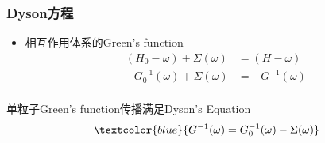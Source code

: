 \frame
{
	\frametitle{\textrm{Dyson}方程}
	\begin{itemize}
		\item 相互作用体系的\textrm{Green's function}
\begin{displaymath}
	\begin{aligned}
		(H_0-\omega)+\Sigma(\omega)&=(H-\omega)\\
		-G_0^{-1}(\omega)+\Sigma(\omega)&=-G^{-1}(\omega)\\
	\end{aligned}
\end{displaymath}
	\end{itemize}
\begin{figure}[h!]
	\vspace{-5pt}
\centering
{}
\label{Multiple_scattering-0-9}
\end{figure}
	\vspace{-0.2in}
单粒子\textrm{Green's function}传播满足\textrm{Dyson's Equation}
\begin{displaymath}
	\textcolor{blue}{G^{-1}(\omega)=G_0^{-1}(\omega)-\Sigma(\omega)}
\end{displaymath}
}

